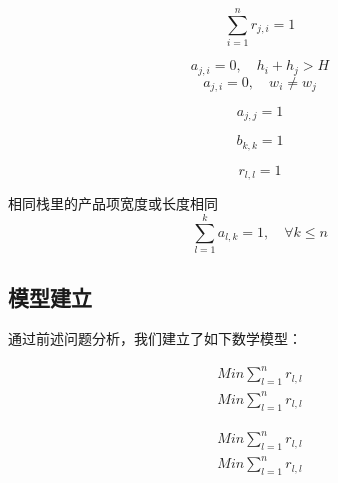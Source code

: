 \documentclass[bwprint]{gmcmthesis}
\begin{document}
\begin{equation}
    \sum_{i=1}^{n} r_{j,i}=1
\end{equation}  


\begin{equation}
    a_{j,i}=0, \quad   h_{i}+h_{j}>H
\end{equation}
\begin{equation}
    a_{j,i}=0, \quad  w_{i} \ne w_{j}
\end{equation}


\begin{equation}
    a_{j,j}=1
\end{equation}


\begin{equation}
    b_{k,k}=1
\end{equation}

\begin{equation}
    r_{l,l}=1
\end{equation}












相同栈里的产品项宽度或长度相同
\begin{equation}
    \sum_{l=1}^{k} a_{l,k}=1,\quad \forall k\leqslant n
\end{equation}  

\subsection{模型建立}
通过前述问题分析，我们建立了如下数学模型：




\begin{equation}
    \begin{aligned}
    Min \sum_{l=1}^{n} r_{l,l}\\
    Min \sum_{l=1}^{n} r_{l,l}
    \end{aligned}
\end{equation}  





\begin{equation}
    \begin{aligned}
    Min \sum_{l=1}^{n} r_{l,l}\\
    Min \sum_{l=1}^{n} r_{l,l}
    \end{aligned}
\end{equation}  
\end{document}
